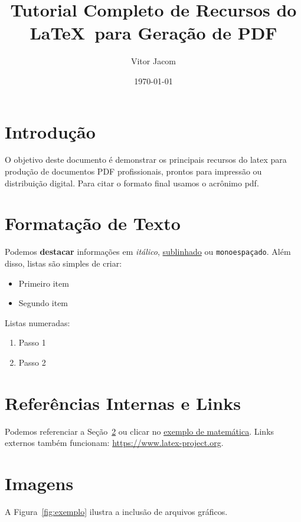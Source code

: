 \documentclass[12pt]{article}
\title{Tutorial Completo de Recursos do \\ \LaTeX\ para Geração de PDF}
\author{Vitor Jacom}
\date{\today}
\begin{document}
\maketitle
\tableofcontents
\newpage

\section{Introdução}
O objetivo deste documento é demonstrar os principais recursos do \gls{latex} para produção de documentos PDF profissionais, prontos para impressão ou distribuição digital. Para citar o formato final usamos o acrônimo \gls{pdf}.

\section{Formatação de Texto}\label{sec:texto}
Podemos \textbf{destacar} informações em \textit{itálico}, \underline{sublinhado} ou
\texttt{monoespaçado}. Além disso, listas são simples de criar:

\begin{itemize}[noitemsep]
  \item Primeiro item
  \item Segundo item
\end{itemize}

Listas numeradas:

\begin{enumerate}[label=\arabic*.]
  \item Passo 1
  \item Passo 2
\end{enumerate}

\section{Referências Internas e Links}
Podemos referenciar a Seção~\ref{sec:texto} ou clicar no
\hyperref[sec:matematica]{exemplo de matemática}. Links externos também funcionam: \url{https://www.latex-project.org}.

\section{Imagens}
A Figura~\ref{fig:exemplo} ilustra a inclusão de arquivos gráficos.
\end{document}
